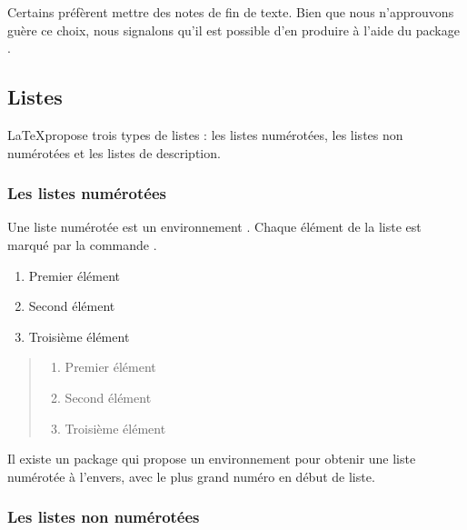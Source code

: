\begin{plusloins}
    Certains préfèrent mettre des notes de fin de texte. Bien que nous n'approuvons guère ce choix, nous signalons qu'il est possible d'en produire à l'aide du package .
\end{plusloins}

\subsection{Listes}

\LaTeX propose trois types de listes : les listes numérotées, les listes non numérotées et les listes de description.

\subsubsection{Les listes numérotées}

Une liste numérotée est un environnement .
Chaque élément de la liste est marqué par la commande .

\begin{latexcode}
\begin{enumerate}
    \item Premier élément
    \item Second élément
    \item Troisième élément
\end{enumerate}
\end{latexcode}

\begin{quotation}
\noindent\begin{enumerate}
    \item Premier élément
    \item Second élément
    \item Troisième élément
\end{enumerate}
\end{quotation}

\begin{plusloins}
Il existe un package  qui propose un environnement   pour obtenir une liste numérotée à l'envers, avec le plus grand numéro en début de liste.

\end{plusloins}
\subsubsection{Les listes non numérotées}

